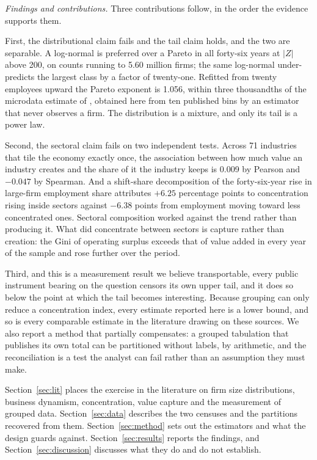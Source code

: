 \documentclass[jrfm,article,submit,pdftex,moreauthors]{Definitions/mdpi}
\begin{document}
\emph{Findings and contributions.} Three contributions follow, in the order the evidence
supports them.

First, the distributional claim fails and the tail claim holds, and the two are separable.
A log-normal is preferred over a Pareto in all forty-six years at $|Z|$ above 200, on counts
running to 5.60 million firms; the same log-normal under-predicts the largest class by a
factor of twenty-one. Refitted from twenty employees upward the Pareto exponent is 1.056,
within three thousandths of the microdata estimate of \citet{Axtell2001}, obtained here from
ten published bins by an estimator that never observes a firm. The distribution is a
mixture, and only its tail is a power law.

Second, the sectoral claim fails on two independent tests. Across 71 industries that tile
the economy exactly once, the association between how much value an industry creates and the
share of it the industry keeps is 0.009 by Pearson and $-0.047$ by Spearman. And a
shift-share decomposition of the forty-six-year rise in large-firm employment share
attributes $+6.25$ percentage points to concentration rising inside sectors against $-6.38$
points from employment moving toward less concentrated ones. Sectoral composition worked
against the trend rather than producing it. What did concentrate between sectors is capture
rather than creation: the Gini of operating surplus exceeds that of value added in every
year of the sample and rose further over the period.

Third, and this is a measurement result we believe transportable, every public instrument
bearing on the question censors its own upper tail, and it does so below the point at which
the tail becomes interesting. Because grouping can only reduce a concentration index, every
estimate reported here is a lower bound, and so is every comparable estimate in the
literature drawing on these sources. We also report a method that partially compensates: a
grouped tabulation that publishes its own total can be partitioned without labels, by
arithmetic, and the reconciliation is a test the analyst can fail rather than an assumption
they must make.

Section~\ref{sec:lit} places the exercise in the literature on firm size distributions,
business dynamism, concentration, value capture and the measurement of grouped data.
Section~\ref{sec:data} describes the two censuses and the partitions recovered from them.
Section~\ref{sec:method} sets out the estimators and what the design guards against.
Section~\ref{sec:results} reports the findings, and Section~\ref{sec:discussion} discusses
what they do and do not establish.
\end{document}
